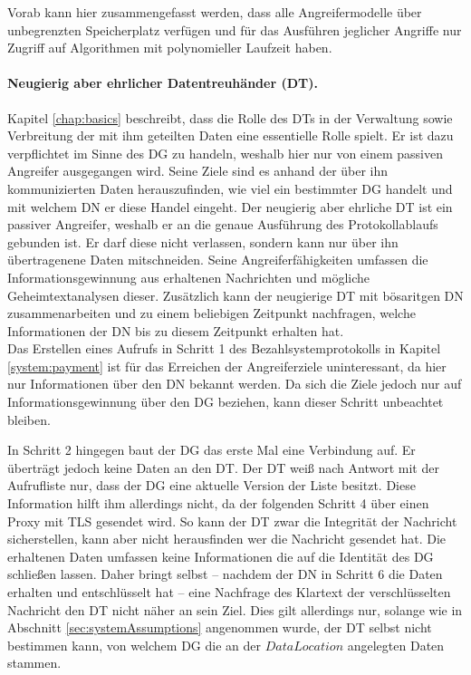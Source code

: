 \documentclass[
	fontsize=11pt,
	headings=small,
	parskip=half,           %
	bibliography=totoc,
	numbers=noenddot,       %
	open=any,               %
]{scrreprt}
\begin{document}
Vorab kann hier zusammengefasst werden, dass alle Angreifermodelle über unbegrenzten Speicherplatz verfügen und für das Ausführen jeglicher Angriffe nur Zugriff auf Algorithmen mit polynomieller Laufzeit haben.


\paragraph{Neugierig aber ehrlicher Datentreuhänder (DT).}
Kapitel \ref{chap:basics} beschreibt, dass die Rolle des DTs in der Verwaltung sowie Verbreitung der mit ihm geteilten Daten eine essentielle Rolle spielt.  Er ist dazu verpflichtet im Sinne des DG zu handeln, weshalb hier nur von einem passiven Angreifer ausgegangen wird. Seine Ziele sind es anhand der über ihn kommunizierten Daten herauszufinden, wie viel ein bestimmter DG handelt und mit welchem DN er diese Handel eingeht. Der neugierig aber ehrliche DT ist ein passiver Angreifer, weshalb er an die genaue Ausführung des Protokollablaufs gebunden ist. Er darf diese nicht verlassen, sondern kann nur über ihn übertragenene Daten mitschneiden. Seine Angreiferfähigkeiten umfassen die Informationsgewinnung aus erhaltenen Nachrichten und mögliche Geheimtextanalysen dieser. Zusätzlich kann der neugierige DT mit bösaritgen DN zusammenarbeiten und zu einem beliebigen Zeitpunkt nachfragen, welche Informationen der DN bis zu diesem Zeitpunkt erhalten hat.\\

Das Erstellen eines Aufrufs in Schritt 1 des Bezahlsystemprotokolls in Kapitel \ref{system:payment} ist für das Erreichen der Angreiferziele uninteressant, da hier nur Informationen über den DN bekannt werden. Da sich die Ziele jedoch nur auf Informationsgewinnung über den DG beziehen, kann dieser Schritt unbeachtet bleiben. 

In Schritt 2 hingegen baut der DG das erste Mal eine Verbindung auf. Er überträgt jedoch keine Daten an den DT. Der DT weiß nach Antwort mit der Aufrufliste nur, dass der DG eine aktuelle Version der Liste besitzt. Diese Information hilft ihm allerdings nicht, da der folgenden Schritt 4 über einen Proxy mit TLS gesendet wird. So kann der DT zwar die Integrität der Nachricht sicherstellen, kann aber nicht herausfinden wer die Nachricht gesendet hat. Die erhaltenen Daten umfassen keine Informationen die auf die Identität des DG schließen lassen. Daher bringt selbst -- nachdem der DN in Schritt 6 die Daten erhalten und entschlüsselt hat -- eine Nachfrage des Klartext der verschlüsselten Nachricht den DT nicht näher an sein Ziel. Dies gilt allerdings nur, solange wie in Abschnitt \ref{sec:systemAssumptions} angenommen wurde, der DT selbst nicht bestimmen kann, von welchem DG die an der $DataLocation$ angelegten Daten stammen.
\end{document}
